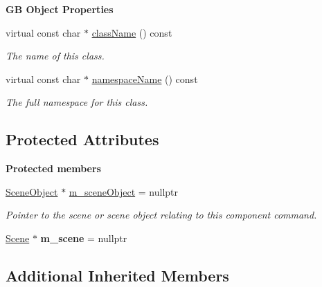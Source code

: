 \begin{Indent}\textbf{ GB Object Properties}\par
\begin{DoxyCompactItemize}
\item 
virtual const char $\ast$ \mbox{\hyperlink{classrev_1_1_component_command_a9fa769c52b149facb70c80bbc03a2be0}{class\+Name}} () const
\begin{DoxyCompactList}\small\item\em The name of this class. \end{DoxyCompactList}\item 
virtual const char $\ast$ \mbox{\hyperlink{classrev_1_1_component_command_a7b4e11189228c9d9e5ff81598cb325f6}{namespace\+Name}} () const
\begin{DoxyCompactList}\small\item\em The full namespace for this class. \end{DoxyCompactList}\end{DoxyCompactItemize}
\end{Indent}
\subsection*{Protected Attributes}
\begin{Indent}\textbf{ Protected members}\par
\begin{DoxyCompactItemize}
\item 
\mbox{\label{classrev_1_1_component_command_a6b9da1d49471c1416583e10895d8184d}} 
\mbox{\hyperlink{classrev_1_1_scene_object}{Scene\+Object}} $\ast$ \mbox{\hyperlink{classrev_1_1_component_command_a6b9da1d49471c1416583e10895d8184d}{m\+\_\+scene\+Object}} = nullptr
\begin{DoxyCompactList}\small\item\em Pointer to the scene or scene object relating to this component command. \end{DoxyCompactList}\item 
\mbox{\label{classrev_1_1_component_command_acae83bab58ae33978be06e436f13cb69}} 
\mbox{\hyperlink{classrev_1_1_scene}{Scene}} $\ast$ {\bfseries m\+\_\+scene} = nullptr
\end{DoxyCompactItemize}
\end{Indent}
\subsection*{Additional Inherited Members}


